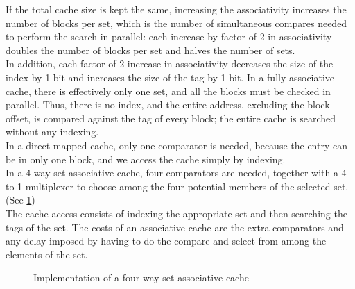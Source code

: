 \documentclass[12pt]{article}
\theoremstyle{definition}
\begin{document}
  If the total cache size is kept the same, increasing the associativity increases the number of blocks per set, which is the number of simultaneous compares needed to perform the search in parallel: each increase by factor of 2 in associativity doubles the number of blocks per set and halves the number of sets. \\
  In addition, each factor-of-2 increase in associativity decreases the size of the index by 1 bit and increases the size of the tag by 1 bit.
  In a fully associative cache, there is effectively only one set, and all the blocks must be checked in parallel.
  Thus, there is no index, and the entire address, excluding the block offset, is compared against the tag of every block;
  the entire cache is searched without any indexing. \\

  In a direct-mapped cache, only one comparator is needed, because the entry can be in only one block, and we access the cache simply by indexing. \\
  In a 4-way set-associative cache, four comparators are needed, together with a 4-to-1 multiplexer to choose among the four potential members of the selected set. (See \ref{4WaySetAssociativeCache})\\
  The cache access consists of indexing the appropriate set and then searching the tags of the set.
  The costs of an associative cache are the extra comparators and any delay imposed by having to do the compare and select from among the elements of the set.

  \begin{figure}[!htp]
    \label{4WaySetAssociativeCache}
    \caption{Implementation of a four-way set-associative cache}
  \end{figure}
\end{document}
